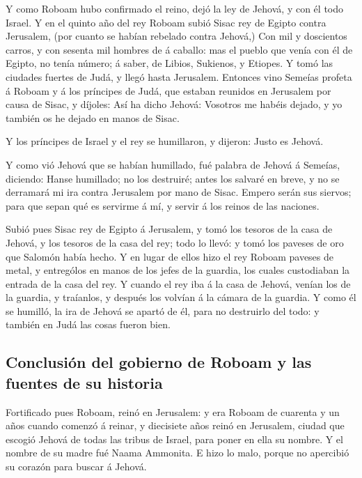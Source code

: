  Y como Roboam hubo confirmado el reino, dejó la ley de
Jehová, y con él todo Israel.  Y en el quinto año del rey
Roboam subió Sisac rey de Egipto contra Jerusalem, (por cuanto se habían
rebelado contra Jehová,)  Con mil y doscientos carros, y
con sesenta mil hombres de á caballo: mas el pueblo que venía con él de
Egipto, no tenía número; á saber, de Libios, Sukienos, y Etiopes.
 Y tomó las ciudades fuertes de Judá, y llegó hasta
Jerusalem.  Entonces vino Semeías profeta á Roboam y á los
príncipes de Judá, que estaban reunidos en Jerusalem por causa de Sisac,
y díjoles: Así ha dicho Jehová: Vosotros me habéis dejado, y yo también
os he dejado en manos de Sisac.

 Y los príncipes de Israel y el rey se humillaron, y
dijeron: Justo es Jehová.

 Y como vió Jehová que se habían humillado, fué palabra de
Jehová á Semeías, diciendo: Hanse humillado; no los destruiré; antes los
salvaré en breve, y no se derramará mi ira contra Jerusalem por mano de
Sisac.  Empero serán sus siervos; para que sepan qué es
servirme á mí, y servir á los reinos de las naciones.

 Subió pues Sisac rey de Egipto á Jerusalem, y tomó los
tesoros de la casa de Jehová, y los tesoros de la casa del rey; todo lo
llevó: y tomó los paveses de oro que Salomón había hecho.
 Y en lugar de ellos hizo el rey Roboam paveses de metal,
y entrególos en manos de los jefes de la guardia, los cuales custodiaban
la entrada de la casa del rey.  Y cuando el rey iba á la
casa de Jehová, venían los de la guardia, y traíanlos, y después los
volvían á la cámara de la guardia.  Y como él se humilló,
la ira de Jehová se apartó de él, para no destruirlo del todo: y también
en Judá las cosas fueron bien.

\hypertarget{conclusiuxf3n-del-gobierno-de-roboam-y-las-fuentes-de-su-historia}{%
\subsection{Conclusión del gobierno de Roboam y las fuentes de su
historia}\label{conclusiuxf3n-del-gobierno-de-roboam-y-las-fuentes-de-su-historia}}

 Fortificado pues Roboam, reinó en Jerusalem: y era
Roboam de cuarenta y un años cuando comenzó á reinar, y diecisiete años
reinó en Jerusalem, ciudad que escogió Jehová de todas las tribus de
Israel, para poner en ella su nombre. Y el nombre de su madre fué Naama
Ammonita.  E hizo lo malo, porque no apercibió su corazón
para buscar á Jehová.

